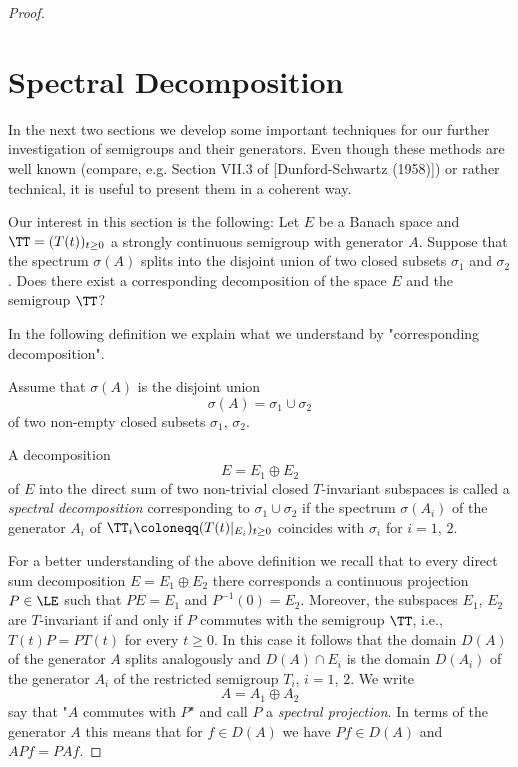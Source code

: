 \begin{proof}
\section{Spectral Decomposition}\label{sec:a3-3}

In the next two sections we develop some important techniques for our further investigation of semigroups and their generators.
Even though these methods are well known (compare, e.g. Section VII.3 of [Dunford-Schwartz (1958)]) or rather technical, it is useful to present them in a coherent way.

Our interest in this section is the following: Let $E$ be a Banach space and $\TT = (T(t))_{t \geq 0}$ a strongly continuous semigroup with generator $A$.
Suppose that the spectrum $\sigma(A)$ splits into the disjoint union of two closed subsets $\sigma_{1}$ and $\sigma_{2}$.
Does there exist a corresponding decomposition of the space $E$ and the semigroup $\TT$?

In the following definition we explain what we understand by "corresponding decomposition".

\begin{definition}\label{def:a3-3.1}

Assume that $\sigma(A)$ is the disjoint union
\[
\sigma(A) = \sigma_{1} \cup \sigma_{2}
\]
of two non-empty closed subsets $\sigma_{1}$, $\sigma_{2}$.

A decomposition
\[
E = E_{1} \oplus E_{2}
\]
of $E$ into the direct sum of two non-trivial closed $T$-invariant subspaces is called a \emph{spectral decomposition} corresponding to $\sigma_{1} \cup \sigma_{2}$ if the spectrum $\sigma(A_{i})$ of the generator $A_{i}$ of $\TT_{i} \coloneqq (T(t)|_{E_{i}})_{t \geq 0}$ coincides with $\sigma_{i}$ for $i = 1$, $2$.
\end{definition}



\newpage

For a better understanding of the above definition we recall that to every direct sum decomposition $E = E_{1} \oplus E_{2}$ there corresponds a continuous projection $P \in \LE$ such that $PE = E_{1}$ and $P^{-1}(0) = E_{2}$.
Moreover, the subspaces $E_{1}$, $E_{2}$ are $T$-invariant if and only if $P$ commutes with the semigroup $\TT$, i.e., $T(t)P = PT(t)$ for every $t \geq 0$.
In this case it follows that the domain $D(A)$ of the generator $A$ splits analogously and $D(A) \cap E_{i}$ is the domain $D(A_{i})$ of the generator $A_{i}$ of the restricted semigroup $T_{i}$, $i = 1$, $2$.
We write
\[
A = A_{1} \oplus A_{2}
\]
say that "$A$ commutes with $P$" and call $P$ a \emph{spectral projection}.
In terms of the generator $A$ this means that for $f \in D(A)$ we have $Pf \in D(A)$ and $APf = PAf$.


\end{proof}
